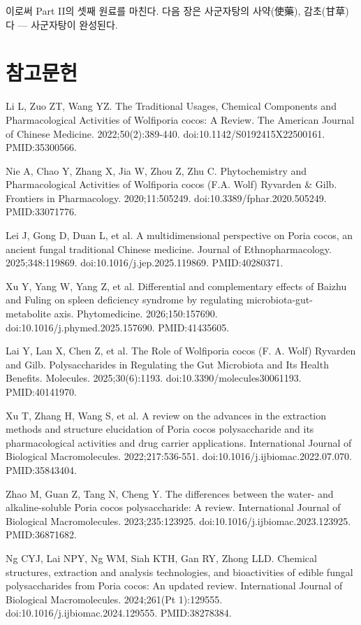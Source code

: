 \documentclass[12pt,oneside]{book}
\newcommand{\refstart}{\par\begingroup\fontsize{8.5pt}{10.2pt}\selectfont\setlength{\parskip}{1.4pt}\raggedright}
\newcommand{\reff}[2]{\par\hangindent=7mm\hangafter=1\noindent[#1]\hspace{2mm}#2\par}
\begin{document}
이로써 Part II의 셋째 원료를 마친다. 다음 장은 사군자탕의 사약(使藥), 감초(甘草)다 — 사군자탕이 완성된다.

\section*{참고문헌}

\refstart

\reff{1}{Li L, Zuo ZT, Wang YZ. The Traditional Usages, Chemical Components and Pharmacological Activities of Wolfiporia cocos: A Review. The American Journal of Chinese Medicine. 2022;50(2):389-440. doi:10.1142/S0192415X22500161. PMID:35300566.}

\reff{2}{Nie A, Chao Y, Zhang X, Jia W, Zhou Z, Zhu C. Phytochemistry and Pharmacological Activities of Wolfiporia cocos (F.A. Wolf) Ryvarden \& Gilb. Frontiers in Pharmacology. 2020;11:505249. doi:10.3389/fphar.2020.505249. PMID:33071776.}

\reff{3}{Lei J, Gong D, Duan L, et al. A multidimensional perspective on Poria cocos, an ancient fungal traditional Chinese medicine. Journal of Ethnopharmacology. 2025;348:119869. doi:10.1016/j.jep.2025.119869. PMID:40280371.}

\reff{4}{Xu Y, Yang W, Yang Z, et al. Differential and complementary effects of Baizhu and Fuling on spleen deficiency syndrome by regulating microbiota-gut-metabolite axis. Phytomedicine. 2026;150:157690. doi:10.1016/j.phymed.2025.157690. PMID:41435605.}

\reff{5}{Lai Y, Lan X, Chen Z, et al. The Role of Wolfiporia cocos (F. A. Wolf) Ryvarden and Gilb. Polysaccharides in Regulating the Gut Microbiota and Its Health Benefits. Molecules. 2025;30(6):1193. doi:10.3390/molecules30061193. PMID:40141970.}

\reff{6}{Xu T, Zhang H, Wang S, et al. A review on the advances in the extraction methods and structure elucidation of Poria cocos polysaccharide and its pharmacological activities and drug carrier applications. International Journal of Biological Macromolecules. 2022;217:536-551. doi:10.1016/j.ijbiomac.2022.07.070. PMID:35843404.}

\reff{7}{Zhao M, Guan Z, Tang N, Cheng Y. The differences between the water- and alkaline-soluble Poria cocos polysaccharide: A review. International Journal of Biological Macromolecules. 2023;235:123925. doi:10.1016/j.ijbiomac.2023.123925. PMID:36871682.}

\reff{8}{Ng CYJ, Lai NPY, Ng WM, Siah KTH, Gan RY, Zhong LLD. Chemical structures, extraction and analysis technologies, and bioactivities of edible fungal polysaccharides from Poria cocos: An updated review. International Journal of Biological Macromolecules. 2024;261(Pt 1):129555. doi:10.1016/j.ijbiomac.2024.129555. PMID:38278384.}
\end{document}
